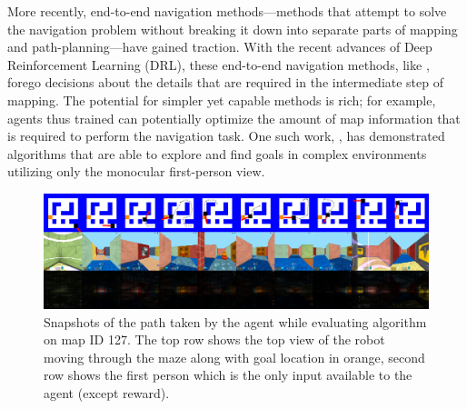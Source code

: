 More recently, end-to-end navigation methods---methods that attempt to  
solve the navigation problem without breaking it down into separate parts of mapping and path-planning---have gained traction.
%
With the recent advances of Deep Reinforcement Learning (DRL), these end-to-end navigation methods, like \cite{MnBaMiICML2016,SiHuMaNATURE2016,LePaKrISER2017,MiPaViICLR2017,OhChSiICML2016}, forego decisions about the details that are required in the intermediate step of mapping.
The potential for simpler yet capable methods is rich; for example, agents thus trained can potentially optimize the amount of map information that is required to perform the navigation task.
One such work, \cite{MiPaViICLR2017}, has demonstrated algorithms that are able to explore and find goals in complex environments utilizing only the monocular first-person view.

\begin{figure}
\includegraphics[width=\textwidth,trim=0 336pt 0 0,clip]{./exp-results/training-09x09-0127-on-0127.png}%
\caption{
Snapshots of the path taken by the agent while evaluating algorithm on map ID 127.
The top row shows the top view of the robot moving through the maze along with goal location in orange, second row shows the first person which is the only input available to the agent (except reward).}
\label{fig:training-qualitative}
\end{figure}

